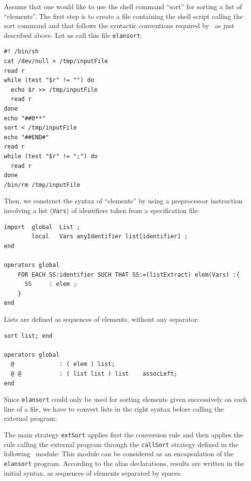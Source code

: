 
\EX

Assume that one would like to use the shell command
``sort'' for sorting a list of ``elements''. The first step is to create a
file containing the shell script calling the sort command and that
follows the syntactic conventions required by \elan\ as just described
above. Let us call this file \texttt{elansort}:
\begin{verbatim}
#! /bin/sh
cat /dev/null > /tmp/inputFile
read r
while (test "$r" != "") do
  echo $r >> /tmp/inputFile 
  read r 
done
echo "##0**"
sort < /tmp/inputFile
echo "##END#"
read r
while (test "$r" != ";") do 
  read r 
done
/bin/rm /tmp/inputFile
\end{verbatim}

Then, we construct the syntax of ``elements'' by using a preprocessor
instruction involving a list (\texttt{Vars}) of identifiers taken from
a specification file:
\begin{verbatim}
import  global  List ;
        local   Vars anyIdentifier list[identifier] ;
end

operators global
    FOR EACH SS:identifier SUCH THAT SS:=(listExtract) elem(Vars) :{
      SS     : elem ;
    }
end
\end{verbatim}

Lists are defined as sequences of elements, without any separator:
\begin{verbatim}
sort list; end

operators global
  @             : ( elem ) list;
  @ @           : ( list list ) list    assocLeft;
end
\end{verbatim}

Since \texttt{elansort} could only be used for sorting elements given
successively on each line of a file, we have to convert lists in the
right syntax before calling the external program:

The main strategy \texttt{extSort} applies first the conversion rule
and then applies the rule calling the external program through the
\texttt{callSort} strategy defined in the following \elan\ module:
This module can be considered as an encapsulation of the
\texttt{elansort} program. According to the alias declarations,
results are written in the initial syntax, as sequences of elements
separated by spaces.
\FEX
